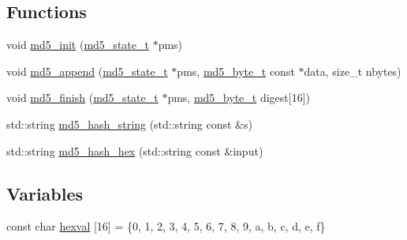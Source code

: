 \subsection*{Functions}
\begin{DoxyCompactItemize}
\item 
void \hyperlink{namespacewebsocketpp_1_1md5_a73499ae9912f813cdbb98d27b6487112}{md5\+\_\+init} (\hyperlink{namespacewebsocketpp_1_1md5_a4be84c20ee3f9d9c76d4e2f7befe2eff}{md5\+\_\+state\+\_\+t} $\ast$pms)
\item 
void \hyperlink{namespacewebsocketpp_1_1md5_afd827a71255e45a8293b9df13342ceb3}{md5\+\_\+append} (\hyperlink{namespacewebsocketpp_1_1md5_a4be84c20ee3f9d9c76d4e2f7befe2eff}{md5\+\_\+state\+\_\+t} $\ast$pms, \hyperlink{namespacewebsocketpp_1_1md5_a0c434041715d244182207c3413e36e71}{md5\+\_\+byte\+\_\+t} const $\ast$data, size\+\_\+t nbytes)
\item 
void \hyperlink{namespacewebsocketpp_1_1md5_a29e7adb892ae2de7d2c4853bc7ace034}{md5\+\_\+finish} (\hyperlink{namespacewebsocketpp_1_1md5_a4be84c20ee3f9d9c76d4e2f7befe2eff}{md5\+\_\+state\+\_\+t} $\ast$pms, \hyperlink{namespacewebsocketpp_1_1md5_a0c434041715d244182207c3413e36e71}{md5\+\_\+byte\+\_\+t} digest\mbox{[}16\mbox{]})
\item 
std\+::string \hyperlink{namespacewebsocketpp_1_1md5_ab445cdc2367665afb8fd4e983a354e0f}{md5\+\_\+hash\+\_\+string} (std\+::string const \&s)
\item 
std\+::string \hyperlink{namespacewebsocketpp_1_1md5_a9fbd05134b509739ff15175fe7104443}{md5\+\_\+hash\+\_\+hex} (std\+::string const \&input)
\end{DoxyCompactItemize}
\subsection*{Variables}
\begin{DoxyCompactItemize}
\item 
const char \hyperlink{namespacewebsocketpp_1_1md5_a6c9cff96cd43c87cb0fc47f7d641dac8}{hexval} \mbox{[}16\mbox{]} = \{\textquotesingle{}0\textquotesingle{}, \textquotesingle{}1\textquotesingle{}, \textquotesingle{}2\textquotesingle{}, \textquotesingle{}3\textquotesingle{}, \textquotesingle{}4\textquotesingle{}, \textquotesingle{}5\textquotesingle{}, \textquotesingle{}6\textquotesingle{}, \textquotesingle{}7\textquotesingle{}, \textquotesingle{}8\textquotesingle{}, \textquotesingle{}9\textquotesingle{}, \textquotesingle{}a\textquotesingle{}, \textquotesingle{}b\textquotesingle{}, \textquotesingle{}c\textquotesingle{}, \textquotesingle{}d\textquotesingle{}, \textquotesingle{}e\textquotesingle{}, \textquotesingle{}f\textquotesingle{}\}
\end{DoxyCompactItemize}


